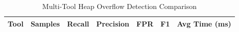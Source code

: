 \begin{table}[htbp]
  \centering
  \caption{Multi-Tool Heap Overflow Detection Comparison}
  \label{tab:tool-comparison}
  \begin{tabular}{lcccccc}
    \toprule
    \textbf{Tool} & \textbf{Samples} & \textbf{Recall} & \textbf{Precision} & \textbf{FPR} & \textbf{F1} & \textbf{Avg Time (ms)} \\
    \midrule
    \bottomrule
  \end{tabular}
\end{table}